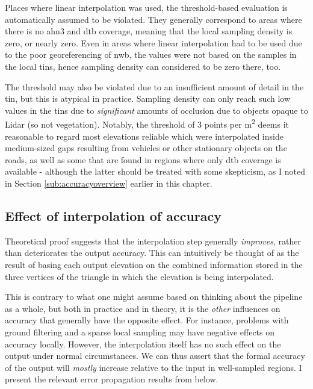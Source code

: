Places where linear interpolation was used, the threshold-based evaluation is automatically assumed to be violated. They generally correspond to areas where there is no \ac{ahn3} and \ac{dtb} coverage, meaning that the local sampling density is zero, or nearly zero. Even in areas where linear interpolation had to be used due to the poor georeferencing of \ac{nwb}, the values were not based on the samples in the local \ac{tin}s, hence sampling density can considered to be zero there, too.

The threshold may also be violated due to an insufficient amount of detail in the \ac{tin}, but this is atypical in practice. Sampling density can only reach such low values in the \ac{tin}s due to \textit{significant} amounts of occlusion due to objects opaque to Lidar (so not vegetation). Notably, the threshold of 3 points per m\textsuperscript{2} deems it reasonable to regard most elevations reliable which were interpolated inside medium-sized gaps resulting from vehicles or other stationary objects on the roads, as well as some that are found in regions where only \ac{dtb} coverage is available - although the latter should be treated with some skepticism, as I noted in Section \ref{sub:accuracyoverview} earlier in this chapter.

\subsection{Effect of interpolation of accuracy}
\label{sub:m_accuracyinterpolation}

Theoretical proof suggests that the interpolation step generally \textit{improves}, rather than deteriorates the output accuracy. This can intuitively be thought of as the result of basing each output elevation on the combined information stored in the three vertices of the triangle in which the elevation is being interpolated.

This is contrary to what one might assume based on thinking about the pipeline as a whole, but both in practice and in theory, it is the \textit{other} influences on accuracy that generally have the opposite effect. For instance, problems with ground filtering and a sparse local sampling may have negative effects on accuracy locally. However, the interpolation itself has no such effect on the output under normal circumstances. We can thus assert that the formal accuracy of the output will \textit{mostly} increase relative to the input in well-sampled regions. I present the relevant error propagation results from \cite{fan_etal_2014} below.

